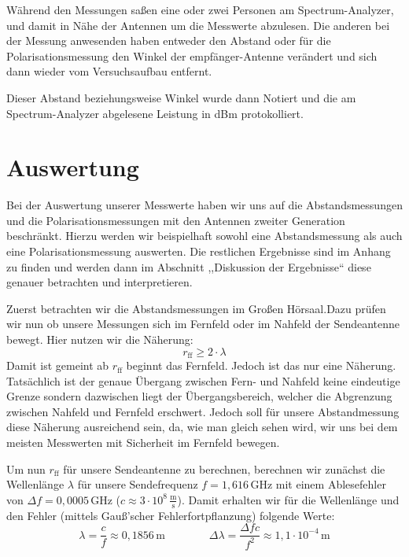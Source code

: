 \documentclass[titlepage,11pt,a4paper,ngerman]{article}
\newcommand{\tx}[1]{\textrm{#1}}
\begin{document}
Während den Messungen saßen eine oder zwei Personen am Spectrum-Analyzer, und damit in Nähe der Antennen um die Messwerte abzulesen. Die anderen bei der Messung anwesenden haben entweder den Abstand oder für die Polarisationsmessung den Winkel der empfänger-Antenne verändert und sich dann wieder vom Versuchsaufbau entfernt.\par
Dieser Abstand beziehungsweise Winkel wurde dann Notiert und die am Spectrum-Analyzer abgelesene Leistung in dBm protokolliert.

\section{Auswertung}
Bei der Auswertung unserer Messwerte haben wir uns auf die Abstandsmessungen und die Polarisationsmessungen mit den Antennen zweiter Generation beschränkt. Hierzu werden wir beispielhaft sowohl eine Abstandsmessung als auch eine Polarisationsmessung auswerten. Die restlichen Ergebnisse sind im Anhang zu finden und werden dann im Abschnitt  ,,Diskussion der Ergebnisse`` diese genauer betrachten und interpretieren. \par 
Zuerst betrachten wir die Abstandsmessungen im Großen Hörsaal.Dazu prüfen wir nun ob unsere Messungen sich im Fernfeld oder im Nahfeld der Sendeantenne bewegt. Hier nutzen wir die Näherung:
\begin{equation}
r_{\tx{ff}} \geqslant 2\cdot\lambda
\label{rff}
\end{equation}
Damit ist gemeint ab $r_{\tx{ff}}$ beginnt das Fernfeld. Jedoch ist das nur eine Näherung. Tatsächlich ist der genaue Übergang zwischen Fern- und Nahfeld keine eindeutige Grenze sondern dazwischen liegt der Übergangsbereich, welcher die Abgrenzung zwischen Nahfeld und Fernfeld erschwert. Jedoch soll für unsere Abstandmessung diese Näherung ausreichend sein, da, wie man gleich sehen wird, wir uns bei dem meisten Messwerten mit Sicherheit im Fernfeld bewegen. \par 
Um nun $r_{\tx{ff}}$ für unsere Sendeantenne zu berechnen, berechnen wir zunächst die Wellenlänge $\lambda$ für unsere Sendefrequenz $f=1{,}616\,$GHz mit einem Ablesefehler von $\Delta f=0{,}0005\,$GHz ($c\approx 3\cdot10^{8}\,\frac{\tx{m}}{\tx{s}}$). Damit erhalten wir für die Wellenlänge und den Fehler (mittels Gauß'scher Fehlerfortpflanzung) folgende Werte:
\begin{equation*}
\lambda = \frac{c}{f} \approx 0{,}1856\,\tx{m} \qquad \qquad
\Delta \lambda = \frac{\Delta f c}{f^{2}} \approx 1{,}1 \cdot 10^{-4}\,\tx{m}
\end{equation*}
\end{document}
